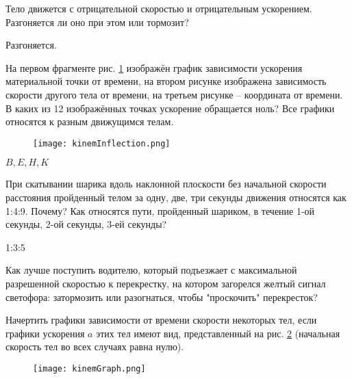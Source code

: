 \begin{ex} %
Тело движется с отрицательной скоростью и отрицательным ускорением. Разгоняется ли оно при этом или тормозит?
\begin{ans}
Разгоняется.
\end{ans}
\end{ex}

\begin{ex} %
На первом фрагменте рис. \ref{kinemInflection} изображён график зависимости ускорения материальной точки от времени, на втором рисунке изображена зависимость скорости другого тела от времени, на третьем рисунке – координата от времени. В каких из 12 изображённых точках ускорение обращается ноль? Все графики относятся к разным движущимся телам.

\begin{figure}[h]
\centering
\texttt{[image: kinemInflection.png]}
\caption{}
\label{kinemInflection}
\end{figure}
\begin{ans}
$B, E, H, K$
\end{ans}
\end{ex}

\begin{ex} %
При скатывании шарика вдоль наклонной плоскости без начальной скорости расстояния пройденный телом за одну, две, три секунды движения относятся как 1:4:9. Почему? Как относятся пути, пройденный шариком, в течение 1-ой секунды, 2-ой секунды, 3-ей секунды?
\begin{ans}
1:3:5
\end{ans}
\end{ex}

\begin{ex} %
Как лучше поступить водителю, который подъезжает с максимальной разрешенной скоростью к перекрестку, на котором загорелся желтый сигнал светофора: затормозить или разогнаться, чтобы "проскочить" перекресток?
\end{ex}


\simpleProblems

\begin{ex} %
Начертить графики зависимости от времени скорости некоторых тел, если графики ускорения $a$ этих тел имеют вид, представленный на рис. \ref{kinemGraph} (начальная скорость тел во всех случаях равна нулю).

\begin{figure}[h]
\centering
\texttt{[image: kinemGraph.png]}
\caption{}
\label{kinemGraph}
\end{figure}
\end{ex}

